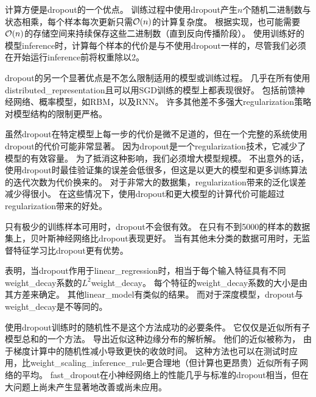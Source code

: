 计算方便是\gls{dropout}的一个优点。
训练过程中使用\gls{dropout}产生$n$个随机二进制数与状态相乘，每个样本每次更新只需$\mathcal{O}(n)$的计算复杂度。
根据实现，也可能需要$\mathcal{O}(n)$的存储空间来持续保存这些二进制数（直到反向传播阶段）。
使用训练好的模型\gls{inference}时，计算每个样本的代价是与不使用\gls{dropout}一样的，尽管我们必须在开始运行\gls{inference}前将权重除以2。


\gls{dropout}的另一个显著优点是不怎么限制适用的模型或训练过程。
几乎在所有使用\gls{distributed_representation}且可以用\gls{SGD}训练的模型上都表现很好。
包括前馈神经网络、概率模型，如\gls{RBM}\citep{Srivastava14}，以及\gls{RNN}\citep{Bayer-et-al-arXiv-2014,Pascanu-et-al-ICLR2014}。
许多其他差不多强大\gls{regularization}策略对模型结构的限制更严格。

虽然\gls{dropout}在特定模型上每一步的代价是微不足道的，但在一个完整的系统使用\gls{dropout}的代价可能非常显著。
因为\gls{dropout}是一个\gls{regularization}技术，它减少了模型的有效容量。
为了抵消这种影响，我们必须增大模型规模。
不出意外的话，使用\gls{dropout}时最佳验证集的误差会低很多，但这是以更大的模型和更多训练算法的迭代次数为代价换来的。
对于非常大的数据集，\gls{regularization}带来的泛化误差减少得很小。
在这些情况下，使用\gls{dropout}和更大模型的计算代价可能超过\gls{regularization}带来的好处。

只有极少的训练样本可用时，\gls{dropout}不会很有效。
在只有不到5000的样本的数据集上\citep{Xiong2011}，贝叶斯神经网络\citep{Neal1996}比\gls{dropout}表现更好\citep{Srivastava14}。
当有其他未分类的数据可用时，无监督特征学习比\gls{dropout}更有优势。


\cite{Wager+al-2013}表明，当\gls{dropout}作用于\gls{linear_regression}时，相当于每个输入特征具有不同\gls{weight_decay}系数的$L^2$\gls{weight_decay}。 每个特征的\gls{weight_decay}系数的大小是由其方差来确定。
其他\gls{linear_model}有类似的结果。
而对于深度模型，\gls{dropout}与\gls{weight_decay}是不等同的。


使用\gls{dropout}训练时的随机性不是这个方法成功的必要条件。
它仅仅是近似所有子模型总和的一个方法。
\cite{WangManning-ICML2013-small}导出近似这种边缘分布的解析解。
他们的近似被称为， 由于梯度计算中的随机性减小导致更快的收敛时间。
这种方法也可以在测试时应用，比\gls{weight_scaling_inference_rule}更合理地（但计算也更昂贵）近似所有子网络的平均。
\gls{fast_dropout}在小神经网络上的性能几乎与标准的\gls{dropout}相当，但在大问题上尚未产生显著地改善或尚未应用。


